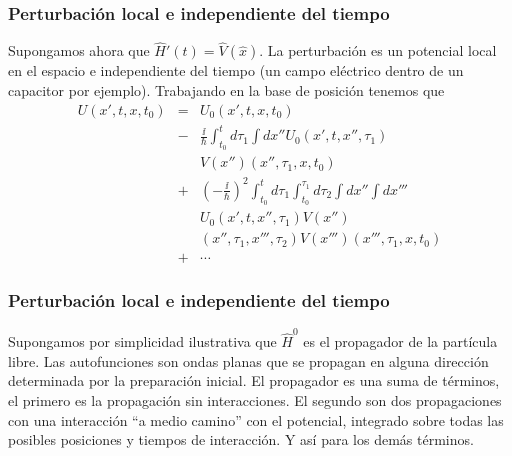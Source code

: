 \documentclass{beamer}
\begin{document}
\begin{frame}
    \frametitle{Perturbación local e independiente del tiempo}
    Supongamos ahora que $\hat{H}'(t)=\hat{V}(\hat{x})$. La perturbación es un potencial local en el espacio e independiente del tiempo (un campo eléctrico dentro de un capacitor por ejemplo). Trabajando en la base de posición tenemos que
    \begin{eqnarray*}
        U(x',t,x,t_0) &=& U_0(x',t,x,t_0)\\
        &-&\frac{\ii}{\hbar}
        \int_{t_0}^t d\tau_1
        \int dx'' U_0(x',t,x'',\tau_1)\\
        &&V(x'')(x'',\tau_1,x,t_0)\\
        &+&
        \left(-\frac{\ii}{\hbar}\right)^2
        \int_{t_0}^t d\tau_1
        \int_{t_0}^{\tau_1} d\tau_2
        \int dx'' \int dx'''\\
        &\ &U_0(x',t,x'',\tau_1)V(x'')\\
        &&(x'',\tau_1,x''',\tau_2)V(x''')(x''',\tau_1,x,t_0)\\
        &+&\cdots
    \end{eqnarray*}
\end{frame}

\begin{frame}
    \frametitle{Perturbación local e independiente del tiempo}
    Supongamos por simplicidad ilustrativa que $\hat{H}^0$ es el propagador de la partícula libre. Las autofunciones son ondas planas que se propagan en alguna dirección determinada por la preparación inicial. El propagador es una suma de términos, el primero es la propagación sin interacciones. El segundo son dos propagaciones con una interacción ``a medio camino'' con el potencial, integrado sobre todas las posibles posiciones y tiempos de interacción. Y así para los demás términos.
\end{frame}
\end{document}
